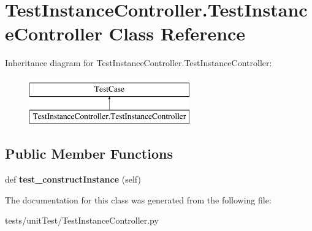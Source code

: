 \hypertarget{class_test_instance_controller_1_1_test_instance_controller}{}\section{Test\+Instance\+Controller.\+Test\+Instance\+Controller Class Reference}
\label{class_test_instance_controller_1_1_test_instance_controller}
Inheritance diagram for Test\+Instance\+Controller.\+Test\+Instance\+Controller\+:\begin{figure}[H]
\begin{center}
\leavevmode
\includegraphics[height=2.000000cm]{class_test_instance_controller_1_1_test_instance_controller}
\end{center}
\end{figure}
\subsection*{Public Member Functions}
\begin{DoxyCompactItemize}
\item 
\mbox{\label{class_test_instance_controller_1_1_test_instance_controller_a22d0c6acd66dcff8579c0eba5e863ee1}} 
def {\bfseries test\+\_\+construct\+Instance} (self)
\end{DoxyCompactItemize}


The documentation for this class was generated from the following file\+:\begin{DoxyCompactItemize}
\item 
tests/unit\+Test/Test\+Instance\+Controller.\+py\end{DoxyCompactItemize}
